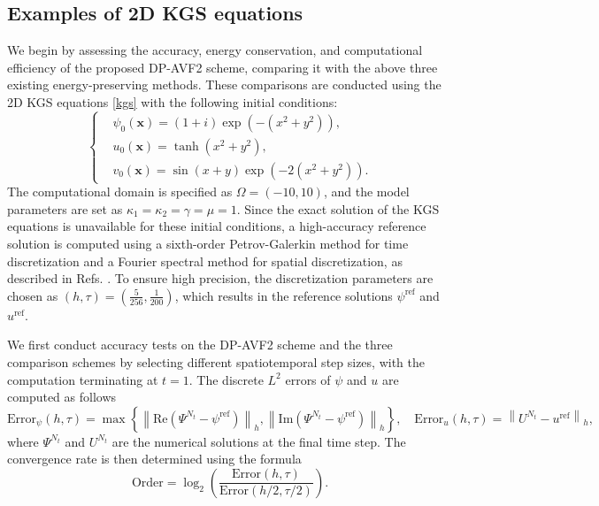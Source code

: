 \documentclass[fleqn,11pt]{elsarticle}
\numberwithin{equation}{section}
\begin{document}
\subsection{Examples of 2D KGS equations}

We begin by assessing the accuracy, energy conservation, and computational efficiency of the proposed DP-AVF2 scheme, comparing it with the above three existing energy-preserving methods. These comparisons are conducted using the 2D KGS equations \eqref{kgs} with the following initial conditions:
\[
\left\lbrace
\begin{aligned}
  & \psi_0(\bm{x}) = (1 + i) \exp{\left( -(x^2 + y^2) \right)}, \\
  & u_0(\bm{x}) = \tanh{\left( x^2 + y^2 \right)}, \\
  & v_0(\bm{x}) = \sin{(x + y)} \exp{\left( -2(x^2 + y^2) \right)}.
\end{aligned}
\right.
\]
The computational domain is specified as $ \Omega = (-10, 10) $, and the model parameters are set as $ \kappa_1 = \kappa_2 = \gamma = \mu = 1 $. Since the exact solution of the KGS equations is unavailable for these initial conditions, a high-accuracy reference solution is computed using a sixth-order Petrov-Galerkin method for time discretization and a Fourier spectral method for spatial discretization, as described in Refs. \cite{kgs_hbvms}. To ensure high precision, the discretization parameters are chosen as $ (h, \tau) = \left(\frac{5}{256}, \frac{1}{200}\right) $, which results in the reference solutions $ \psi^{\text{ref}} $ and $ u^{\text{ref}} $. 

We first conduct accuracy tests on the DP-AVF2 scheme and the three comparison schemes by selecting different spatiotemporal step sizes, with the computation terminating at $ t = 1 $. The discrete $ L^2 $ errors of $\psi$ and $u$ are computed as follows
\[
\text{Error}_{\psi}(h, \tau) = \max\left\{ \left\| \text{Re} \left( \Psi^{N_t} - \psi^{\text{ref}} \right) \right\|_h, \left\| \text{Im} \left( \Psi^{N_t} - \psi^{\text{ref}} \right) \right\|_h \right\},
\quad
\text{Error}_u (h, \tau) = \left\| U^{N_t} - u^{\text{ref}} \right\|_h,
\]
where $ \Psi^{N_t} $ and $ U^{N_t} $ are the numerical solutions at the final time step. The convergence rate is then determined using the formula
\[
\text{Order} = \log_2 \left( \frac{\text{Error}(h, \tau)}{\text{Error}(h/2, \tau/2)} \right).
\]
\end{document}
